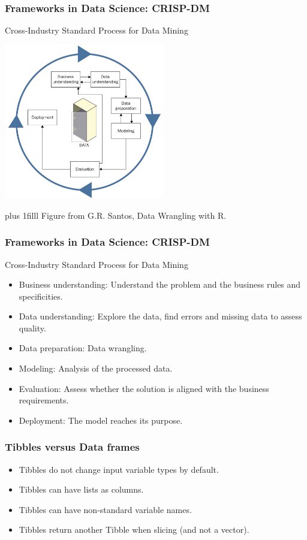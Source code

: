 \documentclass{beamer}
\newcommand{\btVFill}{\vskip0pt plus 1filll}
\begin{document}
	\begin{frame}
		\frametitle{Frameworks in Data Science: CRISP-DM}

		Cross-Industry Standard Process for Data Mining

		\begin{center}
		\includegraphics[width=7cm]{Santos_1_8.png}
		\end{center}

		\btVFill
		\tiny{Figure from G.R. Santos, Data Wrangling with R.}

	\end{frame}

	\begin{frame}
		\frametitle{Frameworks in Data Science: CRISP-DM}

		Cross-Industry Standard Process for Data Mining

		\vspace{2em}

		\begin{itemize}
			\item Business understanding: Understand the problem and the business rules and specificities.
			\item Data understanding: Explore the data, find errors and missing data to assess quality.
			\item Data preparation: Data wrangling.
			\item Modeling: Analysis of the processed data.
			\item Evaluation: Assess whether the solution is aligned with the business requirements.
			\item Deployment: The model reaches its purpose.
		\end{itemize}

	\end{frame}
		
	\begin{frame}
		\frametitle{Tibbles versus Data frames}

		\begin{itemize}
		\setlength{\itemsep}{1em}
			\item Tibbles do not change input variable types by default.
			\item Tibbles can have lists as columns.
			\item Tibbles can have non-standard variable names.
			\item Tibbles return another Tibble when slicing (and not a vector).
		\end{itemize}

	\end{frame}
\end{document}
